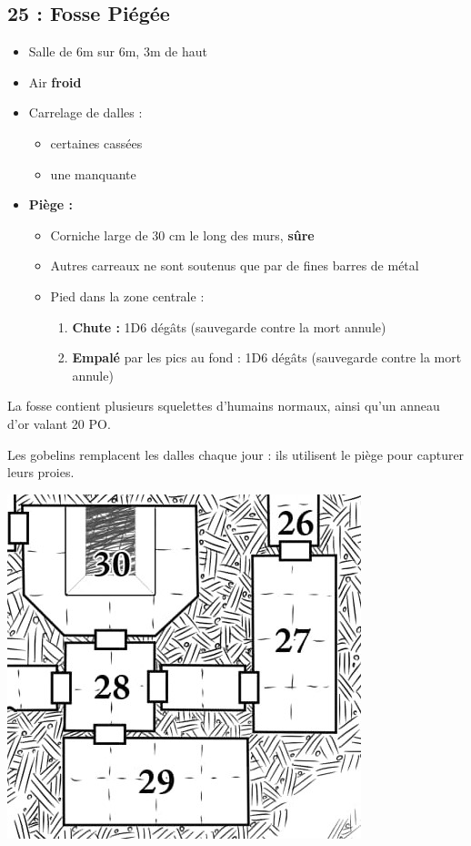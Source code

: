 \subsection{25 : Fosse Piégée}\label{n3:s25}
\begin{itemize}
  \item Salle de 6m sur 6m, 3m de haut
  \item Air \textbf{froid}
  \item Carrelage de dalles :
  \begin{itemize}
    \item certaines cassées
    \item une manquante
  \end{itemize}
  \item \textbf{Piège :}
  \begin{itemize}
    \item Corniche large de 30 cm le long des murs, \textbf{sûre}
    \item Autres carreaux ne sont soutenus que par de fines barres de métal
    \item Pied dans la zone centrale :
    \begin{enumerate}
      \item \textbf{Chute :} 1D6 dégâts (sauvegarde contre la mort annule)
      \item \textbf{Empalé} par les pics au fond : 1D6 dégâts (sauvegarde contre la mort annule)
    \end{enumerate}
  \end{itemize}
\end{itemize}

La fosse contient plusieurs squelettes d'humains normaux, ainsi qu'un anneau d'or valant 20 PO.

Les gobelins remplacent les dalles chaque jour : ils utilisent le piège pour capturer leurs proies.

\vfill\pagebreak

\includegraphics[width=\columnwidth]{pics/map_26-30.jpg}

